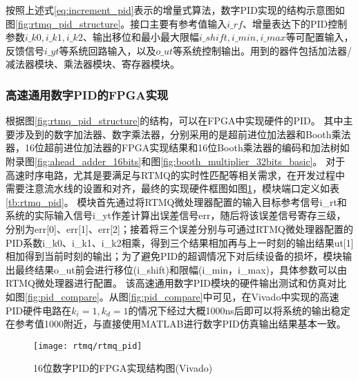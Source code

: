 按照上述式\eqref{eq:increment_pid}表示的增量式算法，数字PID实现的结构示意图如图\ref{fig:rtmq_pid_structure}。接口主要有参考值输入$i\_rf$、增量表达下的PID控制参数$i\_k0, i\_k1, i\_k2$、输出移位和最小最大限幅$i\_shift, i\_min, i\_max$等可配置输入，反馈信号$i\_yt$等系统回路输入，以及$o\_ut$等系统控制输出。用到的器件包括加法器/减法器模块、乘法器模块、寄存器模块。

\subsubsection[高速通用数字PID的FPGA实现]{高速通用数字PID的FPGA实现}

根据图\ref{fig:rtmq_pid_structure}的结构，可以在FPGA中实现硬件的PID。
其中主要涉及到的数字加法器、数字乘法器，分别采用的是超前进位加法器和Booth乘法器，16位超前进位加法器的FPGA实现结果和16位Booth乘法器的编码和加法树如附录图\ref{fig:ahead_adder_16bits}和图\ref{fig:booth_multiplier_32bits_basic}。
对于高速时序电路，尤其是要满足与RTMQ的实时性匹配等相关需求，在开发过程中需要注意流水线的设置和对齐，最终的实现硬件框图如图\ref{fig:digital_pid_structure_16bits}，模块端口定义如表\ref{tb:rtmq_pid}。
模块首先通过将RTMQ微处理器配置的输入目标参考信号i\_rt和系统的实际输入信号i\_yt作差计算出误差信号err，随后将该误差信号寄存三级，分别为err[0]、err[1]、err[2]；接着将三个误差分别与可通过RTMQ微处理器配置的PID系数i\_k0、i\_k1、i\_k2相乘，得到三个结果相加再与上一时刻的输出结果ut[1]相加得到当前时刻的输出；为了避免PID的超调情况下对后续设备的损坏，模块输出最终结果o\_ut前会进行移位(i\_shift)和限幅(i\_min，i\_max)，具体参数可以由RTMQ微处理器进行配置。
该高速通用数字PID模块的硬件输出测试和仿真对比如图\ref{fig:pid_compare}。从图\ref{fig:pid_compare}中可见，在Vivado中实现的高速PID硬件电路在$k_i=1, k_d=1$的情况下经过大概1000ns后即可以将系统的输出稳定在参考值1000附近，与直接使用MATLAB进行数字PID仿真输出结果基本一致。

\begin{figure}
    \centering
    \texttt{[image: rtmq/rtmq\_pid]}
    \caption[16位数字PID的FPGA实现结构图]{16位数字PID的FPGA实现结构图(Vivado)\label{fig:digital_pid_structure_16bits}}
\end{figure}

